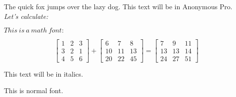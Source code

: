 \documentclass{article}
\begin{document}
	
	\normalfont
	The quick fox jumps over the lazy dog. This text will be in Anonymous Pro.\\
	
	\itshape
	Let's calculate:
	
	$This\ is\ a\ math\ font:$
	
	\[
	\begin{bmatrix}
		1&2&3\\
		3&2&1\\
		4&5&6
	\end{bmatrix}
+
\begin{bmatrix}
	6&7&8\\
	10&11&13\\
	20&22&45
\end{bmatrix}
=
\begin{bmatrix}
	7&9&11\\
	13&13&14\\
	24&27&51
\end{bmatrix}
	\]
	
	This text will be in italics.
	
	\normalfont
	This is normal font.
\end{document}
